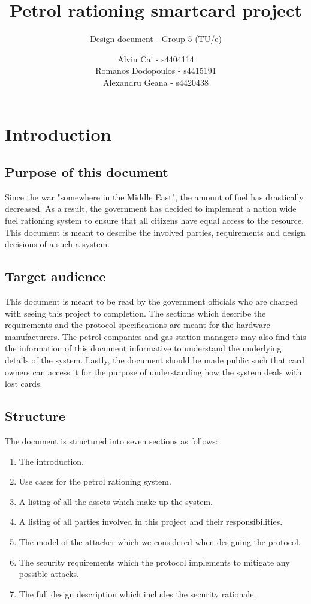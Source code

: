 \documentclass[a4paper,10pt]{llncs}
\title{Petrol rationing smartcard project}
\subtitle{Design document - Group 5 (TU/e)}
\author{Alvin Cai - s4404114 \\ Romanos Dodopoulos - s4415191 \\ Alexandru Geana - s4420438}
\institute{}
\begin{document}
\maketitle

\section{Introduction}
\subsection{Purpose of this document}

Since the war "somewhere in the Middle East", the amount of fuel has drastically decreased. As a result, the government has decided to implement a nation wide fuel rationing system to ensure that all citizens have equal access to the resource. This document is meant to describe the involved parties, requirements and design decisions of a such a system. 

\subsection{Target audience}

This document is meant to be read by the government officials who are charged with seeing this project to completion. The sections which describe the requirements and the protocol specifications are meant for the hardware manufacturers. The petrol companies and gas station managers may also find this the information of this document informative to understand the underlying details of the system. Lastly, the document should be made public such that card owners can access it for the purpose of understanding how the system deals with lost cards.

\subsection{Structure}

The document is structured into seven sections as follows:
\begin{enumerate}
  \item The introduction.
  \item Use cases for the petrol rationing system.
  \item A listing of all the assets which make up the system.
  \item A listing of all parties involved in this project and their responsibilities.
  \item The model of the attacker which we considered when designing the protocol.
  \item The security requirements which the protocol implements to mitigate any possible attacks.
  \item The full design description which includes the security rationale.
\end{enumerate}
\end{document}
